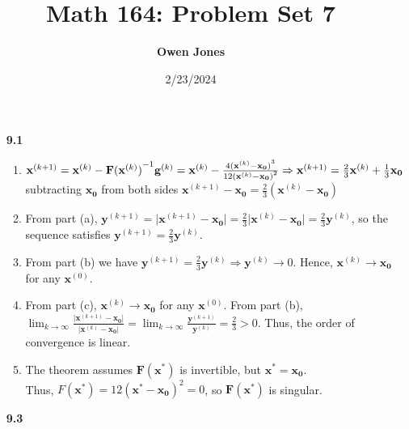 \documentclass[10pt]{article}
\title{\bf Math 164: Problem Set 7}
\date{2/23/2024}
\author{\bf Owen Jones}
\begin{document}
\maketitle
\begin{enumerate}
    \item [\textbf{9.1}] \begin{enumerate}
        \item $\mathbf{x}^{(k+1)}=\mathbf{x}^{(k)}-{\mathbf{F}(\mathbf{x}^{(k)})}^{-1}\mathbf{g}^{(k)}\\
        =\mathbf{x}^{(k)}-\frac{4{(\mathbf{x}^{(k)}-\mathbf{x_0})}^3}{12{(\mathbf{x}^{(k)}-\mathbf{x_0})}^2}\\
        \Rightarrow \mathbf{x}^{(k+1)}=\frac{2}{3}\mathbf{x}^{(k)}+\frac{1}{3}\mathbf{x_0}$\\
        subtracting $\mathbf{x_0}$ from both sides $\mathbf{x}^{(k+1)}-\mathbf{x_0}=\frac{2}{3}(\mathbf{x}^{(k)}-\mathbf{x_0})$
        \item From part (a), $\mathbf{y}^{(k+1)}=\lvert\mathbf{x}^{(k+1)}-\mathbf{x_0}\rvert=\frac{2}{3}\lvert\mathbf{x}^{(k)}-\mathbf{x_0}\rvert=\frac{2}{3}\mathbf{y}^{(k)}$, so the sequence satisfies $\mathbf{y}^{(k+1)}=\frac{2}{3}\mathbf{y}^{(k)}$.
        \item From part (b) we have $\mathbf{y}^{(k+1)}=\frac{2}{3}\mathbf{y}^{(k)}\Rightarrow \mathbf{y}^{(k)}\rightarrow 0$. Hence, $\mathbf{x}^{(k)}\rightarrow \mathbf{x_0}$ for any $\mathbf{x}^{(0)}$.
        \item From part (c), $\mathbf{x}^{(k)}\rightarrow \mathbf{x_0}$ for any $\mathbf{x}^{(0)}$. 
        From part (b), $\displaystyle \lim_{k\rightarrow \infty}\frac{\lvert\mathbf{x}^{(k+1)}-\mathbf{x_0}\rvert}{\lvert\mathbf{x}^{(k)}-\mathbf{x_0}\rvert}=\lim_{k\rightarrow \infty}\frac{\mathbf{y}^{(k+1)}}{\mathbf{y}^{(k)}}=\frac{2}{3}>0$. 
        Thus, the order of convergence is linear.
        \item The theorem assumes $\mathbf{F}(\mathbf{\mathbf{x}^*})$ is invertible, but $\mathbf{x}^*=\mathbf{x_0}$.\\
         Thus, $F(\mathbf{x}^*)=12{(\mathbf{x}^*-\mathbf{x_0})}^2=0$, so $\mathbf{F}(\mathbf{\mathbf{x}^*})$ is singular.
    \end{enumerate}
    \item [\textbf{9.3}] 
\end{enumerate}
\end{document}

